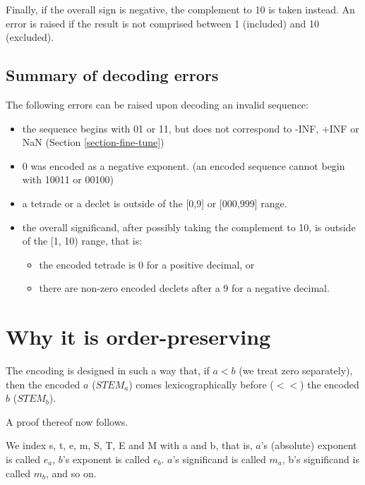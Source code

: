 \documentclass{acm_proc_article-sp}
\begin{document}
Finally, if the overall sign is negative, the complement to 10 is taken instead. An error is raised if the result is not comprised between 1 (included) and 10 (excluded).

\subsection{Summary of decoding errors}
The following errors can be raised upon decoding an invalid sequence:
\begin{itemize}
\item the sequence begins with 01 or 11, but does not correspond to -INF, +INF or NaN (Section \ref{section-fine-tune})
\item 0 was encoded as a negative exponent. (an encoded sequence cannot begin with 10011 or 00100)
\item a tetrade or a declet is outside of the [0,9] or [000,999] range.
\item the overall significand, after possibly taking the complement to 10, is outside of the [1, 10) range, that is:
\begin{itemize}
\item the encoded tetrade is 0 for a positive decimal, or
\item there are non-zero encoded declets after a 9 for a negative decimal.
\end{itemize}
\end{itemize}

\section{Why it is order-preserving}
\label{section-proof}

The encoding is designed in such a way that, if $a < b$ (we treat zero separately), then the encoded $a$ ($STEM_a$) comes lexicographically before ($<<$) the encoded $b$ ($STEM_b$).

A proof thereof now follows.

We index s, t, e, m, S, T, E and M with a and b, that is, $a$'s (absolute) exponent is called $e_a$, $b$'s exponent is called $e_b$. $a$'s significand is called $m_a$, b's significand is called $m_b$, and so on.
 
\end{document}
